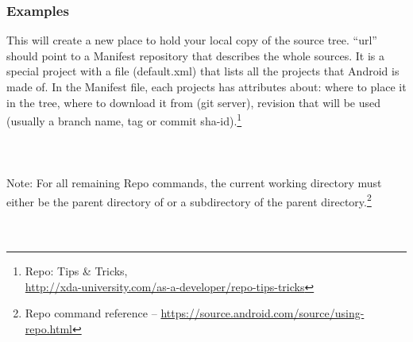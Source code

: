 \subsubsection{Examples}
This will create a new place to hold your local copy of the source
tree.   ``url'' should point to a Manifest repository that
describes the whole sources.  It is a special project with a file
(default.xml) that lists all the projects that Android is made of.
In the Manifest file, each projects has attributes about: where to
place it in the tree, where to download it from (git server),
revision that will be used (usually a branch name, tag or commit
sha-id).\footnote{Repo: Tips \& Tricks,\\
\href{http://xda-university.com/as-a-developer/repo-tips-tricks}{http://xda-university.com/as-a-developer/repo-tips-tricks}}
\\
\\
\indent{}
\\
\\
\noindent Note: For all remaining Repo commands, the current working
directory must either be the parent directory of 
or a subdirectory of the parent directory.\footnote{Repo command reference --
\href{https://source.android.com/source/using-repo.html\#forall}{https://source.android.com/source/using-repo.html}}\\
\\
\\
\noindent {}

